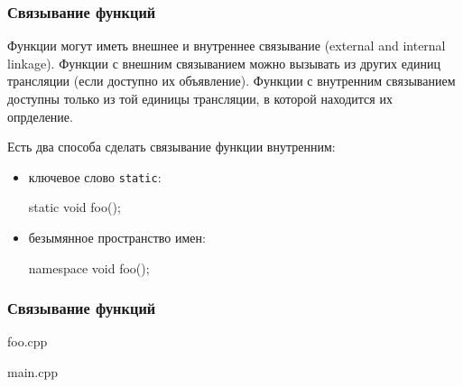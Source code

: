 \documentclass[compress, 8pt]{beamer}
\begin{document}
\begin{frame}[fragile]

    \frametitle{Связывание функций}

    Функции могут иметь внешнее и внутреннее связывание (external and internal linkage).
    Функции с внешним связыванием можно вызывать из других единиц трансляции
    (если доступно их объявление).
    Функции с внутренним связыванием доступны только из той единицы трансляции,
    в которой находится их опрделение.

    \hfill\break
    Есть два способа сделать связывание функции внутренним:

    \begin{itemize}

        \item ключевое слово \verb|static|:
            \begin{myinplacelisting}[minted language=cpp]
static void foo();
            \end{myinplacelisting}

        \item безымянное пространство имен:
            \begin{myinplacelisting}[minted language=cpp]
namespace {
    void foo();
}
            \end{myinplacelisting}

    \end{itemize}

\end{frame}

\begin{frame}[fragile]

    \frametitle{Связывание функций}

    \hfill\break
        {foo.cpp}

        {main.cpp}

\end{frame}
\end{document}
